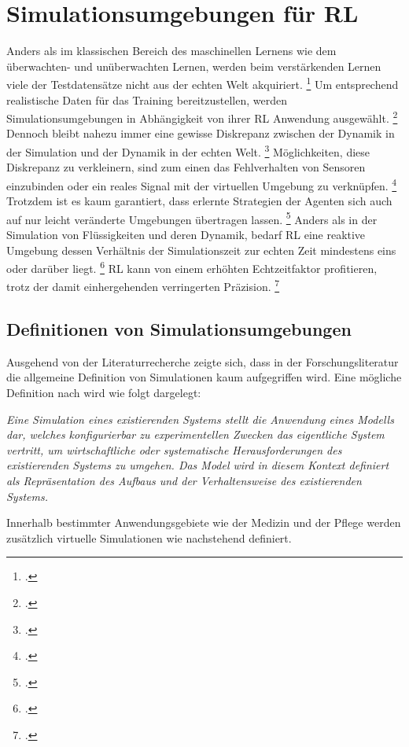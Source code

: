 \section{Simulationsumgebungen für RL}

Anders als im klassischen Bereich des maschinellen Lernens wie dem überwachten- und unüberwachten Lernen, werden beim verstärkenden Lernen viele der Testdatensätze nicht aus der echten Welt akquiriert. \footcite[Vgl.][S. 1]{Zhang.2018}
Um entsprechend realistische Daten für das Training bereitzustellen, werden Simulationsumgebungen in Abhängigkeit von ihrer RL Anwendung ausgewählt. \footcite[Vgl.][S. 7]{Korber.2021}
Dennoch bleibt nahezu immer eine gewisse Diskrepanz zwischen der Dynamik in der Simulation und der Dynamik in der echten Welt. \footcite[Vgl.][S. 1]{Bharadhwaj.2019}
Möglichkeiten, diese Diskrepanz zu verkleinern, sind zum einen das Fehlverhalten von Sensoren einzubinden oder ein reales Signal mit der virtuellen Umgebung zu verknüpfen. \footcite[Vgl.][S. 1]{Zhang.2018}
Trotzdem ist es kaum garantiert, dass erlernte Strategien der Agenten sich auch auf nur leicht veränderte Umgebungen übertragen lassen. \footcite[Vgl.][S. 1]{Bharadhwaj.2019}
Anders als in der Simulation von Flüssigkeiten und deren Dynamik, bedarf RL eine reaktive Umgebung dessen Verhältnis der Simulationszeit zur echten Zeit mindestens eins oder darüber liegt. \footcite[Vgl.][S. 3]{Korber.2021}
RL kann von einem erhöhten Echtzeitfaktor profitieren, trotz der damit einhergehenden verringerten Präzision. \footcite[Vgl.][S. 3]{Korber.2021}

\subsection{Definitionen von Simulationsumgebungen}
Ausgehend von der Literaturrecherche zeigte sich, dass in der Forschungsliteratur die allgemeine Definition von Simulationen kaum aufgegriffen wird.
Eine mögliche Definition nach \cite[]{Maria.1997} wird wie folgt dargelegt:

\textit{Eine Simulation eines existierenden Systems stellt die Anwendung eines Modells dar, welches konfigurierbar zu experimentellen Zwecken das eigentliche System vertritt, um wirtschaftliche oder systematische Herausforderungen des existierenden Systems zu umgehen.
Das Model wird in diesem Kontext definiert als Repräsentation des Aufbaus und der Verhaltensweise des existierenden Systems.}

Innerhalb bestimmter Anwendungsgebiete wie der Medizin und der Pflege werden zusätzlich virtuelle Simulationen wie nachstehend definiert.

